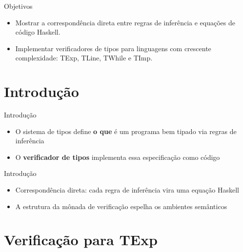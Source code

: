 \subtitle{\bf Aula 16 - Introdução}
\begin{frame}[t,plain]
    \titlepage
\end{frame}

\begin{frame}{Objetivos}

    \begin{itemize}
        \item
        Mostrar a correspondência direta entre regras de inferência e equações
        de código Haskell.
        \item
        Implementar verificadores de tipos para linguagens com crescente
        complexidade: TExp, TLine, TWhile e TImp.
    \end{itemize}
\end{frame}


\section{Introdução}\label{introduuxe7uxe3o}

\begin{frame}{Introdução}

    \begin{itemize}

        \item
        O sistema de tipos define \textbf{o que} é um programa bem tipado via
        regras de inferência
        \item
        O \textbf{verificador de tipos} implementa essa especificação como
        código
    \end{itemize}
\end{frame}

\begin{frame}{Introdução}

    \begin{itemize}

        \item
        Correspondência direta: cada regra de inferência vira uma equação
        Haskell
        \item
        A estrutura da mônada de verificação espelha os ambientes semânticos
    \end{itemize}
\end{frame}


\section{Verificação para TExp}\label{verificauxe7uxe3o-para-texp}

